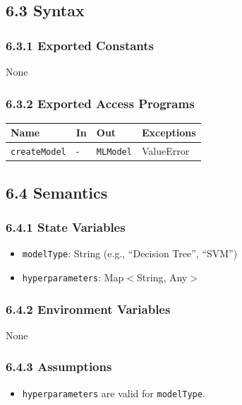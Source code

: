 \documentclass[12pt, titlepage]{article}
\begin{document}
\subsection{6.3 Syntax}

\subsubsection{6.3.1 Exported Constants}
None

\subsubsection{6.3.2 Exported Access Programs}
\begin{center}
\begin{tabular}{p{3.5cm} p{3cm} p{4cm} p{3cm}}
\hline
\textbf{Name} & \textbf{In} & \textbf{Out} & \textbf{Exceptions} \\
\hline
\texttt{createModel} & - & \texttt{MLModel} & ValueError \\
\hline
\end{tabular}
\end{center}

\subsection{6.4 Semantics}

\subsubsection{6.4.1 State Variables}
\begin{itemize}
    \item \texttt{modelType}: String (e.g., ``Decision Tree'', ``SVM'')
    \item \texttt{hyperparameters}: Map$<$String, Any$>$
\end{itemize}

\subsubsection{6.4.2 Environment Variables}
None

\subsubsection{6.4.3 Assumptions}
\begin{itemize}
    \item \texttt{hyperparameters} are valid for \texttt{modelType}.
\end{itemize}
\end{document}
